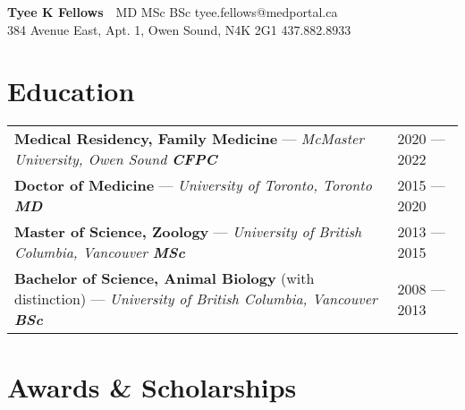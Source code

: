 \documentclass[a4paper,10pt,oneside,onecolumn,draft]{article} %
\renewcommand\arraystretch{1.2}
\begin{document}
\begin{flushleft}
  {\bfseries\huge Tyee K Fellows}{\ \ MD MSc BSc}\hfill{\raggedleft{} tyee.fellows@medportal.ca}\\[3pt]
  {384  Avenue East, Apt. 1, Owen Sound, N4K 2G1}\hfill{\raggedleft{} 437.882.8933}\\
\end{flushleft}

\renewcommand\arraystretch{1.1}  %
\section*{Education}
\begin{tabular*}{1\textwidth}{Z!{\SubVRule}z}
  {\bfseries Medical Residency, Family Medicine}{ --- \slshape McMaster University, Owen Sound \hfill \normalfont{} \bfseries CFPC\/}&2020 --- 2022\\
  {\bfseries Doctor of Medicine}{ --- \slshape University of Toronto, Toronto \hfill \normalfont{} \bfseries MD\/}&2015 --- 2020\\
  {\bfseries Master of Science, Zoology}{ --- \slshape University of British Columbia, Vancouver \hfill \normalfont{} \bfseries MSc\/}&2013 --- 2015\\
  {\bfseries Bachelor of Science, Animal Biology }{\small (with distinction)}{ --- \normalsize\slshape University of British Columbia, Vancouver \hfill \normalfont{} \bfseries BSc\/}&2008 --- 2013\\
\end{tabular*}%
\renewcommand\arraystretch{1.2} %

\section*{Awards \& Scholarships}
\end{document}
